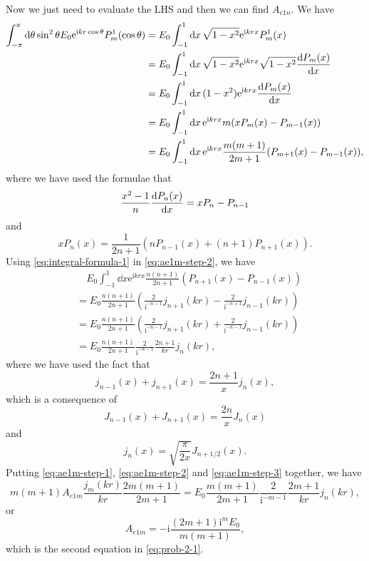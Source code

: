 \documentclass[hyperref, a4paper]{article}
\newcommand*{\ii}{\mathrm{i}}
\newcommand*{\ee}{\mathrm{e}}
\begin{document}
Now we just need to evaluate the LHS and then we can find $A_{e1n}$.
We have 
\begin{equation}
    \begin{aligned}
        \int_{-\pi}^\pi \dd{\theta} \sin^2\theta E_0 \ee^{\ii k r \cos\theta} P_m^1(\cos\theta) &= E_0 \int_{-1}^1 \dd{x} \sqrt{1-x^2} \ee^{\ii k r x} P_m^1(x) \\
        &= E_0 \int_{-1}^1 \dd{x} \sqrt{1-x^2} \ee^{\ii k r x} \sqrt{1-x^2} \dv{P_m(x)}{x} \\
        &= E_0 \int_{-1}^1 \dd{x} (1-x^2) \ee^{\ii k r x} \dv{P_m(x)}{x} \\
        &= E_0 \int_{-1}^1 \dd{x} \ee^{\ii k r x} m(x P_m(x) - P_{m-1}(x)) \\
        &= E_0 \int_{-1}^1 \dd{x} \ee^{\ii k r x} \frac{m(m+1)}{2m+1} (P_{m+1}(x) - P_{m-1}(x)),
    \end{aligned}
    \label{eq:ae1m-step-2}
\end{equation}
where we have used the formulae that 
\[
    \frac{x^2 - 1}{n} \dv{P_n(x)}{x} = x P_n - P_{n-1}
\]
and 
\[
    x P_n(x) = \frac{1}{2n+1} \left( n P_{n-1}(x) + (n+1) P_{n+1}(x) \right).
\]
Using \eqref{eq:integral-formula-1} in \eqref{eq:ae1m-step-2}, we have 
\begin{equation}
    \begin{aligned}
        &\quad E_0 \int_{-1}^1 \dd{x} \ee^{\ii k r x} \frac{n(n+1)}{2n+1} (P_{n+1}(x) - P_{n-1}(x)) \\
        &= E_0 \frac{n(n+1)}{2n+1} \left( \frac{2}{\ii^{-n-1}} j_{n+1}(kr) - \frac{2}{\ii^{-n+1}} j_{n-1}(kr) \right) \\
        &= E_0 \frac{n(n+1)}{2n+1} \left( \frac{2}{\ii^{-n-1}} j_{n+1}(kr) + \frac{2}{\ii^{-n-1}} j_{n-1}(kr) \right) \\
        &= E_0 \frac{n(n+1)}{2n+1} \frac{2}{\ii^{-n-1}} \frac{2n+1}{kr} j_n(kr),
    \end{aligned}
    \label{eq:ae1m-step-3}
\end{equation}
where we have used the fact that 
\[
    j_{n-1}(x) + j_{n+1}(x) = \frac{2n+1}{x} j_n(x),
\]
which is a consequence of 
\[
    J_{n-1}(x) + J_{n+1}(x) = \frac{2n}{x} J_n(x)
\]
and 
\[
    j_n(x) = \sqrt{\frac{\pi}{2x}} J_{n+1/2}(x).
\]
Putting \eqref{eq:ae1m-step-1}, \eqref{eq:ae1m-step-2} and \eqref{eq:ae1m-step-3} together, we have 
\[
    m(m+1) A_{e1m} \frac{j_m(kr)}{kr} \frac{2m (m+1)}{2m+1} = E_0 \frac{m(m+1)}{2m+1} \frac{2}{\ii^{-m-1}} \frac{2m+1}{kr} j_n(kr),
\]
or 
\[
    A_{e1m} = - \ii \frac{(2m+1) \ii^m E_0}{m(m+1)},
\]
which is the second equation in \eqref{eq:prob-2-1}.
\end{document}
